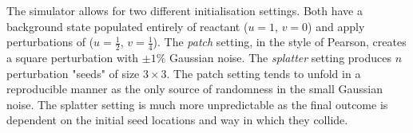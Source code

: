 The simulator allows for two different initialisation settings. Both have a background state populated entirely of reactant ($u=1$, $v = 0$) and apply perturbations of ($u=\frac{1}{2}$, $v = \frac{1}{4}$). The \textit{patch} setting, in the style of Pearson\cite{pearson1993complex}, creates a square perturbation with $\pm1\%$ Gaussian noise. The \textit{splatter} setting produces $n$ perturbation "seeds" of size $3\times3$. The patch setting tends to unfold in a reproducible manner as the only source of randomness in the small Gaussian noise. The splatter setting is much more unpredictable as the final outcome is dependent on the initial seed locations and way in which they collide.
\begin{figure}[!h]
\centering
            \hfill
            \hfill
            \hfill
            \hfill

\end{figure}
